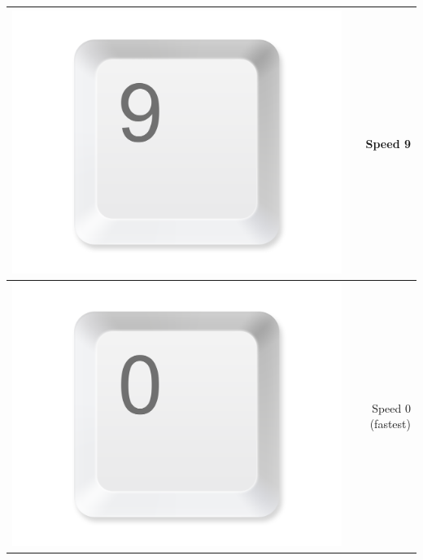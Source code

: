 \documentclass[11pt,a4paper]{report}
\begin{document}
\begin{table}[htbp]
\begin{tabular}{rr}
    \midrule
          \includegraphics[width=\buttonsize\textwidth]{Button9} & Speed 9 \\
    \midrule
          \includegraphics[width=\buttonsize\textwidth]{Button0} & Speed 0 (fastest)\\
    \midrule

\end{tabular}
\end{table}
\end{document}
